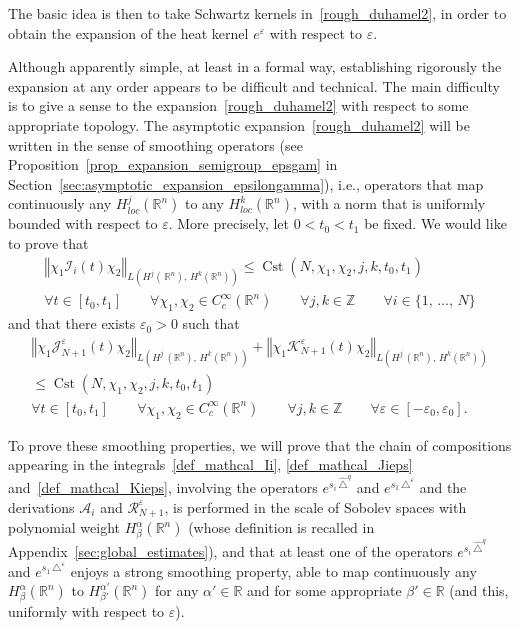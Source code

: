 \documentclass[10pt]{amsart}
\theoremstyle{definition}\newtheorem{defi}[theo]{Definition}\newtheorem{rema}[theo]{Remark}\newtheorem{exam}[theo]{Example}\newtheorem{exem}[theo]{Example}\newtheorem{nota}[theo]{Notation}
\newcommand*\R{\mathbb{R}}
\newcommand*\Z{\mathbb{Z}}
\newcommand{\calK}{\mathcal{K}}
\newcommand{\calA}{\mathcal{A}}
\newcommand{\calR}{\mathcal{R}}
\newcommand{\calI}{\mathcal{I}}
\newcommand{\calJ}{\mathcal{J}}
\DeclareMathOperator{\Cst}{Cst}
\renewcommand{\leq}{\leqslant}
\let\oldforall\forall
\renewcommand*{\forall}{\mathrel{\oldforall}}
\begin{document}
The basic idea is then to take Schwartz kernels in~\eqref{rough_duhamel2}, in order to obtain the expansion of the heat kernel $e^\varepsilon$ with respect to $\varepsilon$.


Although apparently simple, at least in a formal way, establishing rigorously the expansion at any order appears to be difficult and technical. The main difficulty is to give a sense to the expansion~\eqref{rough_duhamel2} with respect to some appropriate topology. The asymptotic expansion~\eqref{rough_duhamel2} will be written in the sense of smoothing operators (see Proposition~\ref{prop_expansion_semigroup_epsgam} in Section~\ref{sec:asymptotic_expansion_epsilongamma}), i.e., operators that map continuously any $H^j_{loc}(\R^n)$ to any $H^k_{loc}(\R^n)$, with a norm that is uniformly bounded with respect to $\varepsilon$. More precisely, let $0<t_0<t_1$ be fixed. We would like to prove that
\begin{multline}\label{smoothingpropertyIi}
\left\Vert\chi_1\calI_i(t)\chi_2\right\Vert_{L\left(H^j(\,\R^n),\,H^k(\R^n)\right)} \leq \Cst\left(N,\chi_1,\chi_2,j,k,t_0,t_1\right) \\
\forall t\in[t_0,t_1] \qquad \forall \chi_1,\chi_2\in C^\infty_c(\R^n) \qquad\forall j,k\in\Z \qquad \forall i\in\{1,\,\ldots,\,N\}
\end{multline}
and that there exists $\varepsilon_0>0$ such that
\begin{multline}\label{smoothingproperty_JKNeps}
\left\Vert\chi_1\calJ_{N+1}^\varepsilon(t)\chi_2\right\Vert_{L\left(H^j\,(\R^n),\,H^k(\R^n)\right)} +
\left\Vert\chi_1\calK_{N+1}^\varepsilon(t)\chi_2\right\Vert_{L\left(H^j\,(\R^n),\,H^k(\R^n)\right)} \\
\leq \Cst\left(N,\chi_1,\chi_2,j,k,t_0,t_1\right) \\
\forall t\in[t_0,t_1] \qquad \forall \chi_1,\chi_2\in C^\infty_c(\R^n) \qquad\forall j,k\in\Z \qquad\forall\varepsilon\in[-\varepsilon_0,\varepsilon_0].
\end{multline}

To prove these smoothing properties, we will prove that the chain of compositions appearing in the integrals~\eqref{def_mathcal_Ii}, \eqref{def_mathcal_Jieps} and~\eqref{def_mathcal_Kieps}, involving the operators $e^{s_i \,\widehat{\triangle}^{q}}$ and $e^{s_1\,\triangle^\varepsilon}$ and the derivations $\calA_i$ and $\calR_{N+1}^\varepsilon$, is performed in the scale of Sobolev spaces with polynomial weight $H^\alpha_\beta(\R^n)$ (whose definition is recalled in Appendix~\ref{sec:global_estimates}), and that at least one of the operators $e^{s_i\,\widehat{\triangle}^{q}}$ and $e^{s_1\,\triangle^\varepsilon}$ enjoys a strong smoothing property, able to map continuously any $H^\alpha_\beta(\R^n)$ to $H^{\alpha'}_{\beta'}(\R^n)$ for any $\alpha'\in\R$ and for some appropriate $\beta'\in\R$ (and this, uniformly with respect to $\varepsilon$).
\end{document}
